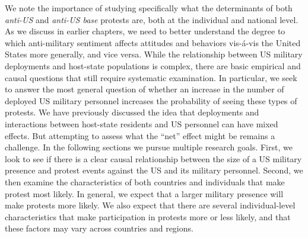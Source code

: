 


We note the importance of studying specifically what the determinants of both \textit {anti-US} and \textit{anti-US base} protests are, both at the individual and national level. As we discuss in earlier chapters, we need to better understand the degree to which anti-military sentiment affects attitudes and behaviors vis-\'{a}-vis the United States more generally, and vice versa. While the relationship between US military deployments and host-state populations is complex, there are basic empirical and causal questions that still require systematic examination. In particular, we seek to answer the most general question of whether an increase in the number of deployed US military personnel increases the probability of seeing these types of protests. We have previously discussed the idea that deployments and interactions between host-state residents and US personnel can have mixed effects. But attempting to assess what the ``net'' effect might be remains a challenge. In the following sections we pursue multiple research goals. First, we look to see if there is a clear causal relationship between the size of a US military presence and protest events against the US and its military personnel. Second, we then examine the characteristics of both countries and individuals that make protest most likely. In general, we expect that a larger military presence will make protests more likely. We also expect that there are several individual-level characteristics that make participation in protests more or less likely, and that these factors may vary across countries and regions. 

